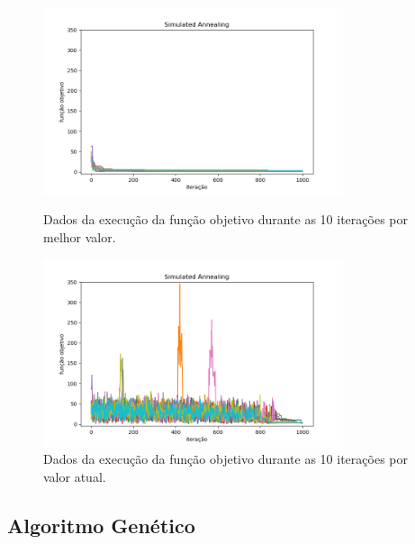 \begin{figure}[H]
\centering
  \begin{minipage}[b]{0.48\textwidth}
    \includegraphics[width=88mm]{imagens/otima/problema-2-simulated-annealing-funcao-objetivo-best.png}
    \caption{Dados da execução da função objetivo durante as 10 iterações por melhor valor.
    \label{fig:problema-2-simulated-annealing-funcao-objetivo-best}}
  \end{minipage}
  \hfill
  \begin{minipage}[b]{0.48\textwidth}
    \includegraphics[width=88mm]{imagens/otima/problema-2-simulated-annealing-funcao-objetivo-value.png}
    \caption{Dados da execução da função objetivo durante as 10 iterações por valor atual.
    \label{fig:problema-2-simulated-annealing-funcao-objetivo-value}}
  \end{minipage}
\end{figure}

\subsection{Algoritmo Genético}


